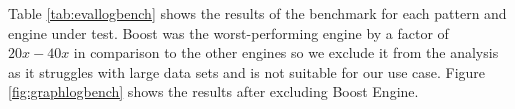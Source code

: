 {\renewcommand{\arraystretch}{1.3}%
\begin{table}[H]
\centering
\small
{}
\caption{Patterns Used in Log Benchmark and Number of Matches.}\label{tab:pattlogbench}
\end{table}
}

Table \ref{tab:evallogbench} shows the results of the benchmark for each pattern and engine under test. Boost was the worst-performing engine by a factor of $20x-40x$ in comparison to the other engines so we exclude it from the analysis as it struggles with large data sets and is not suitable for our use case. Figure \ref{fig:graphlogbench} shows the results after excluding Boost Engine.

